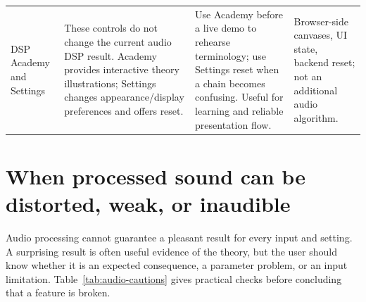 \documentclass[11pt,a4paper]{article}
\begin{document}
{\begin{longtable}{@{}p{.18\linewidth}p{.27\linewidth}p{.27\linewidth}p{.20\linewidth}@{}}
DSP Academy and Settings & These controls do not change the current audio DSP result. Academy provides interactive theory illustrations; Settings changes appearance/display preferences and offers reset. & Use Academy before a live demo to rehearse terminology; use Settings reset when a chain becomes confusing. Useful for learning and reliable presentation flow. & Browser-side canvases, UI state, backend reset; not an additional audio algorithm.\\
\end{longtable}
}

\section{When processed sound can be distorted, weak, or inaudible}
Audio processing cannot guarantee a pleasant result for every input and setting. A surprising result is often useful evidence of the theory, but the user should know whether it is an expected consequence, a parameter problem, or an input limitation. Table~\ref{tab:audio-cautions} gives practical checks before concluding that a feature is broken.
\end{document}

